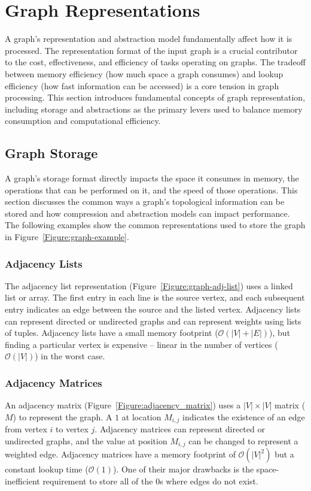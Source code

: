\section{Graph Representations}
\label{section:23-graph-representations}
A graph's representation and abstraction model fundamentally affect how it is processed. 
The representation format of the input graph is a crucial contributor to the cost, effectiveness, and efficiency of \gai tasks operating on graphs.
The tradeoff between memory efficiency (how much space a graph consumes) and lookup efficiency (how fast information can be accessed) is a core tension in graph processing.
This section introduces fundamental concepts of graph representation, including storage and abstractions as the primary levers used to balance memory consumption and computational efficiency. 

\subsection{Graph Storage}
A graph's storage format directly impacts the space it consumes in memory, the operations that can be performed on it, and the speed of those operations.
This section discusses the common ways a graph's topological information can be stored and how compression and abstraction models can impact performance. 
The following examples show the common representations used to store the graph in Figure~\ref{Figure:graph-example}. 



\subsubsection{Adjacency Lists}
The adjacency list representation (Figure~\ref{Figure:graph-adj-list}) uses a linked list or array.
The first entry in each line is the source vertex, and each subsequent entry indicates an edge between the source and the listed vertex.
Adjacency lists can represent directed or undirected graphs and can represent weights using lists of tuples.
Adjacency lists have a small memory footprint ($\mathcal{O}(|V|+|E|)$), but finding a particular vertex is expensive -- linear in the number of vertices ($\mathcal{O}(|V|)$) in the worst case.



\subsubsection{Adjacency Matrices}
An adjacency matrix (Figure~\ref{Figure:adjacency_matrix}) uses a $|V|\times|V|$ matrix ($M$) to represent the graph.
A $1$ at location $M_{i,j}$ indicates the existence of an edge from vertex $i$ to vertex $j$. 
Adjacency matrices can represent directed or undirected graphs, and the value at position $M_{i,j}$ can be changed to represent a weighted edge. 
Adjacency matrices have a memory footprint of $\mathcal{O}(|V|^{2})$ but a constant lookup time ($\mathcal{O}(1)$).
One of their major drawbacks is the space-inefficient requirement to store all of the $0$s where edges do not exist.

